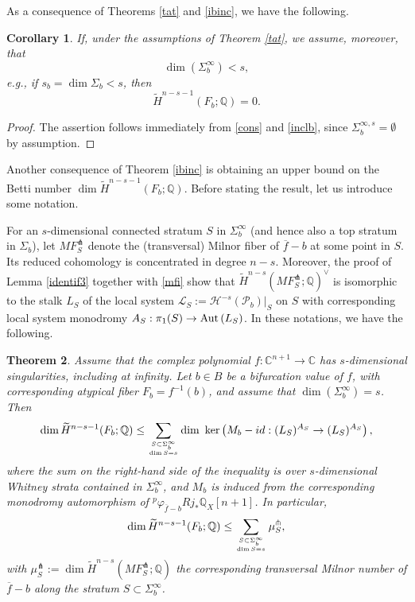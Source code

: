 \documentclass[12pt,leqno,twoside]{amsart}
\newtheorem{theorem}{Theorem}[section]
\newtheorem{corollary}[theorem]{Corollary}
\theoremstyle{remark}
\theoremstyle{remark}
\theoremstyle{definition}
\theoremstyle{remark}
\theoremstyle{remark}
\theoremstyle{remark}
\numberwithin{equation}{section}  %
\def\be{\begin{equation}}
\def\ee{\end{equation}}
\def\bt{\begin{theorem}}
\def\et{\end{theorem}}
\def\bc{\begin{corollary}}
\def\ec{\end{corollary}}
\newcommand{\cH}{\mathcal{H}}
\newcommand{\cL}{\mathcal{L}}
\newcommand{\cP}{\mathcal{P}}
\newcommand{\bC}{\mathbb{C}}
\newcommand{\bQ}{\mathbb{Q}}
\newcommand{\of}{\overline{f}}
\newcommand{\wti}{\widetilde}
\begin{document}
As a consequence of Theorems \ref{tat} and \ref{ibinc}, we have the following.
\bc\label{cor43}
If, under the assumptions of Theorem \ref{tat}, we assume, moreover, that 
\[\dim(\Sigma_b^\infty) <s,\] 
e.g., if $s_b=\dim \Sigma_b <s$, then 
\[  \wti{H}^{n-s-1}(F_b;\bQ)=0.\]
\ec

\begin{proof}
The  assertion follows immediately from \eqref{cons} and \eqref{inclb}, since $\Sigma_b^{\infty,s}=\emptyset$ by assumption.
\end{proof}

Another consequence of Theorem \ref{ibinc} is obtaining an upper bound on the Betti number $\dim  \wti{H}^{n-s-1}(F_b;\bQ)$. Before stating the result, let us introduce some notation. 

For an $s$-dimensional connected stratum $S$ in $\Sigma_b^{\infty}$ (and hence also a top stratum in $\Sigma_b$), let $MF^\pitchfork_{S}$ denote the (transversal) Milnor fiber of $\of-b$ at some point in $S$. Its reduced cohomology is concentrated in degree $n-s$. Moreover, the proof of Lemma \ref{identif3} together with \eqref{mfi} show that $\wti{H}^{n-s}(MF^\pitchfork_{S};\bQ)^\vee$ is isomorphic to the stalk $L_S$ of the local system $\cL_S:=\cH^{-s}(\cP_b)\vert_S$ on $S$ with corresponding local system monodromy
$A_S:\pi_1(S) \to {\rm Aut}\left(L_S\right)$.
In these notations, we have the following.
\bt\label{topbb}
Assume that the complex polynomial $f\colon \bC^{n+1} \to \bC$ has $s$-dimensional singularities, including at infinity. Let $b \in B$ be a bifurcation value of $f$, with corresponding atypical fiber $F_b=f^{-1}(b)$, and assume that $\dim(\Sigma_b^\infty) =s$. Then
\be\label{bbound}
\dim  \wti{H}^{n-s-1}(F_b;\bQ) \leq \sum_{S \subset \Sigma_b^\infty \atop \dim S=s} \dim \ \ker \left(M_b - id:  (L_S)^{A_S} \to (L_S)^{A_S} \right),
\ee
where the sum on the right-hand side of the inequality is over $s$-dimensional Whitney strata contained in $\Sigma_b^\infty$, and $M_b$ is induced from the corresponding monodromy automorphism of ${^p\varphi}_{\of-b}Rj_*\bQ_X[n+1]$. In particular, 
\be\label{bbound2}
\dim  \wti{H}^{n-s-1}(F_b;\bQ) \leq \sum_{S \subset \Sigma_b^\infty \atop \dim S=s} \mu^\pitchfork_S,
\ee
with $\mu^\pitchfork_S:=\dim \wti{H}^{n-s}(MF^\pitchfork_{S};\bQ)$ the corresponding transversal Milnor number of $\of-b$ along the stratum $S \subset \Sigma_b^\infty$.
\et
\end{document}
